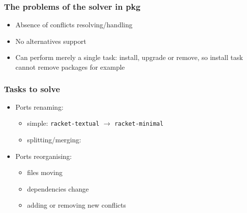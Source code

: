 \documentclass{beamer}
\begin{document}
\begin{frame}
\frametitle{The problems of the solver in pkg}

\begin{itemize}
\item Absence of conflicts resolving/handling
\item No alternatives support
\item Can perform merely a single task: install, upgrade or remove, 
so install task cannot remove packages for example
\end{itemize}

\end{frame}

\begin{frame}
\frametitle{Tasks to solve}
\begin{itemize}
  \item Ports renaming: 
  \begin{itemize}
    \item simple:
    \texttt{racket-textual} $\rightarrow$ \texttt{racket-minimal}
    \item splitting/merging: 
    \begin{figure}[h!]
	\end{figure}
  \end{itemize}
  \item Ports reorganising:
  	\begin{itemize}
    	\item files moving
    	\item dependencies change
    	\item adding or removing new conflicts
    \end{itemize} 

\end{itemize}
\end{frame}
\end{document}
